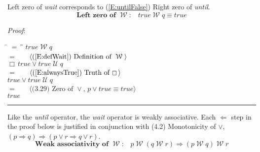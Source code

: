 \documentclass[12pt, fleqn, leqno]{article}
\newcommand{\lgap}{2pt}                             %
\newcommand{\mymathindent}{24pt}                    %
\newcommand{\impl}{\ensuremath{\Rightarrow}}        %
\newcommand{\foll}{\ensuremath{\Leftarrow}}         %
\newcommand{\Until}{\;\mathcal{U}\;}
\newcommand{\Wait}{\;\mathcal{W}\;}
\newcommand{\Always}{\Box\,}
\newcommand{\myqed}{\rule[-.23ex]{1.2ex}{2.0ex}}
\newcommand{\myqedtab}{\hspace{384pt}}              %
\newcommand{\Gll} {\langle}                         %
\newcommand{\Ggg} {\rangle}                         %
\newcommand{\Hint}[1]     {\ \ \ $\Gll              \mbox{#1} \Ggg$ }   %
\begin{document}
Left zero of \textit{wait} corresponds to (\ref{E:untilFalse}) Right zero of \textit{until}.
\begin{equation}\label{E:leftZeroWait}
\textbf{Left zero of $\Wait$:}\quad true \Wait q \equiv true
\end{equation}

\emph{Proof}:
\begin{tabbing}
\hspace{\mymathindent} \= $= \;$ \= \myqedtab \= \kill
\> \> $true \Wait q$\\[\lgap]
\> $=$ \> \Hint{(\ref{E:defWait}) Definition of $\Wait$} \\[\lgap]
\> \> $\Always true \lor true\Until q$\\[\lgap]
\> $=$ \> \Hint{(\ref{E:alwaysTrue}) Truth of $\Always$} \\[\lgap]
\> \> $true \lor true\Until q$\\[\lgap]
\> $=$ \> \Hint{(3.29) Zero of $\lor$, $p\lor true \equiv true$}\\[\lgap]
\> \> $true$ \quad \myqed
\end{tabbing}

Like the \textit{until} operator, the \textit{wait} operator is weakly associative.
Each $\foll$ step in the proof below is justified in conjunction with (4.2) Monotonicity of $\lor$, $(p\impl q)\impl (p\lor r \impl q\lor r)$.
\begin{equation}\label{E:waitAssocImp}
\textbf{Weak associativity of $\Wait$:}\quad p \Wait (q \Wait r) \impl (p \Wait q) \Wait r
\end{equation}
\end{document}
